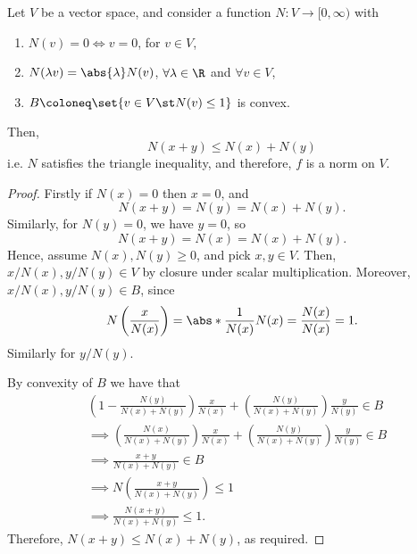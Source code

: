 \begin{nthm}
\label{thm:norm-convex-triangle}
  Let $V$ be a vector space, and consider a function $N : V \to [0,\infty)$ with
  \begin{enumerate}
  \item $N(v) = 0 \iff v =0$, for $v \in V$,
  \item $N(\lambda v) = \abs{\lambda}N(v)$, $\forall \lambda \in \R$ and $\forall v \in V$,
  \item $B \coloneq \set{v \in V \st N(v) \leq 1}$ is convex.
  \end{enumerate}
  Then,
  \begin{equation*}
    N(x+y) \leq N(x) + N(y)
  \end{equation*}
  i.e. $N$ satisfies the triangle inequality, and therefore, $f$ is a norm on $V$.
\end{nthm}
\begin{proof}
  Firstly if $N(x)=0$ then $x=0$, and
  \begin{equation*}
    N(x+y) = N(y) = N(x) + N(y).
  \end{equation*}
  Similarly, for $N(y)=0$, we have $y=0$, so
  \begin{equation*}
    N(x+y) = N(x) = N(x) + N(y).
  \end{equation*}
  Hence, assume $N(x), N(y) \geq 0$, and pick $x, y \in V$. Then, $x/N(x), y/N(y) \in V$ by closure under scalar multiplication. Moreover, $x/N(x), y/N(y) \in B$, since
  \begin{equation*}
    N\left(\frac{x}{N(x)}\right) = \abs*{\frac{1}{N(x)}}N(x) = \frac{N(x)}{N(x)} = 1.
  \end{equation*}
  Similarly for $y/N(y)$.

  By convexity of $B$ we have that
  \begin{align*}
  &\left(1 - \frac{N(y)}{N(x)+N(y)}\right)\frac{x}{N(x)} + \left(\frac{N(y)}{N(x)+N(y)}\right)\frac{y}{N(y)} \in B\\
  &\implies \left(\frac{N(x)}{N(x)+N(y)}\right)\frac{x}{N(x)} + \left(\frac{N(y)}{N(x)+N(y)}\right)\frac{y}{N(y)} \in B\\
  &\implies \frac{x+y}{N(x)+N(y)} \in B\\
  &\implies N\left(\frac{x+y}{N(x)+N(y)}\right) \leq 1\\
  &\implies \frac{N(x+y)}{N(x)+N(y)} \leq 1.
  \end{align*}
  Therefore, $N(x+y) \leq N(x) + N(y)$, as required.
\end{proof}

